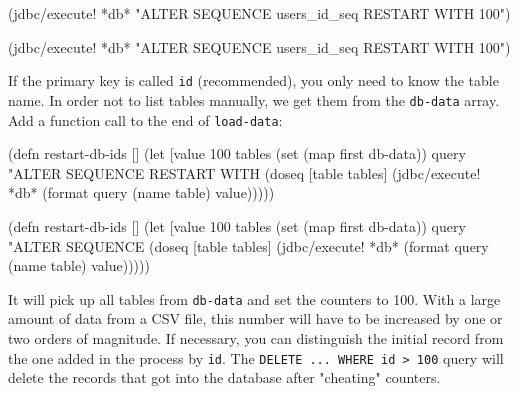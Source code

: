 \ifnarrow

\begin{english}
  \begin{clojure}
(jdbc/execute! *db*
  "ALTER SEQUENCE users_id_seq
   RESTART WITH 100")
  \end{clojure}
\end{english}

\else

\begin{english}
  \begin{clojure}
(jdbc/execute! *db*
  "ALTER SEQUENCE users_id_seq RESTART WITH 100")
  \end{clojure}
\end{english}

\fi

If the primary key is called \verb|id| (recommended), you only need to know the table name. In order not to list tables manually, we get them from the \verb|db-data| array. Add a function call to the end of \verb|load-data|:


\ifnarrow

\begin{english}
  \begin{clojure}
(defn restart-db-ids []
  (let [value 100
        tables (set (map first db-data))
        query "ALTER SEQUENCE %
               RESTART WITH %
    (doseq [table tables]
      (jdbc/execute! *db*
        (format query
          (name table) value)))))
  \end{clojure}
\end{english}

\else

\begin{english}
  \begin{clojure}
(defn restart-db-ids []
  (let [value 100
        tables (set (map first db-data))
        query "ALTER SEQUENCE %
    (doseq [table tables]
      (jdbc/execute! *db* (format query (name table) value)))))
  \end{clojure}
\end{english}

\fi

It will pick up all tables from \verb|db-data| and set the counters to 100. With a large amount of data from a CSV file, this number will have to be increased by one or two orders of magnitude. If necessary, you can distinguish the initial record from the one added in the process by \verb|id|. The \verb|DELETE ... WHERE id > 100| query will delete the records that got into the database after "cheating" counters.

